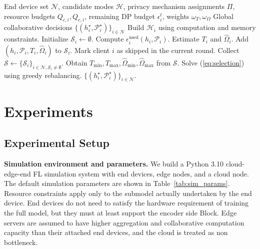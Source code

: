 ﻿\documentclass[preprint,12pt]{elsarticle}
\theoremstyle{plain}
\theoremstyle{definition}
\theoremstyle{remark}
\newcommand{\tabref}[1]{Table~\ref{#1}}
\newcommand{\equref}[1]{(\ref{#1})}
\newcommand{\method}{DynFedPrivacy}
\begin{document}
\begin{algorithm}[t]
\caption{Privacy Aware Dynamic Hierarchical Mode Selection (\method)}
\label{alg:selection}
\begin{algorithmic}[1]
\REQUIRE End device set \(\mathcal{N}\), candidate modes \(\mathcal{H}\), privacy mechanism assignments \(\Pi\), resource budgets \(Q_{c,i},Q_{e,i}\), remaining DP budget \(\epsilon_i^t\), weights \(\omega_T,\omega_\Omega\)
\ENSURE Global collaborative decisions \(\{(h_i^\star,\mathcal{P}_i^\star)\}_{i\in\mathcal{N}}\)
    \STATE Build \(\mathcal{H}_i\) using computation and memory constraints.
    \STATE Initialize \(\mathcal{S}_i\leftarrow\emptyset\).
            \STATE Compute \(\epsilon_i^{\mathrm{used}}(h_i,\mathcal{P}_i)\).
                \STATE Estimate \(T_i\) and \(\widehat{\Omega}_i\).
                \STATE Add \((h_i,\mathcal{P}_i,T_i,\widehat{\Omega}_i)\) to \(\mathcal{S}_i\).
            \ENDIF
        \ENDFOR
    \ENDFOR
        \STATE Mark client \(i\) as skipped in the current round.
    \ENDIF
\ENDFOR
\STATE Collect \(\mathcal{S}\leftarrow\{\mathcal{S}_i\}_{i\in\mathcal{N},\mathcal{S}_i\neq\emptyset}\).
\STATE Obtain \(T_{\min},T_{\max},\widehat{\Omega}_{\min},\widehat{\Omega}_{\max}\) from \(\mathcal{S}\).
\STATE Solve \equref{eq:selection} using greedy rebalancing.
\STATE \RETURN \(\{(h_i^\star,\mathcal{P}_i^\star)\}_{i\in\mathcal{N}}\).
\end{algorithmic}
\end{algorithm}

\section{Experiments}
\label{sec:experiment}
\subsection{Experimental Setup}
\label{sec:exp_setup}
\textbf{Simulation environment and parameters.}
We build a Python 3.10 cloud-edge-end FL simulation system with end devices, edge nodes, and a cloud node.
The default simulation parameters are shown in \tabref{tab:sim_params}.
Resource constraints apply only to the submodel actually undertaken by the end device.
End devices do not need to satisfy the hardware requirement of training the full model, but they must at least support the encoder side Block.
Edge servers are assumed to have higher aggregation and collaborative computation capacity than their attached end devices, and the cloud is treated as non bottleneck.
\end{document}

